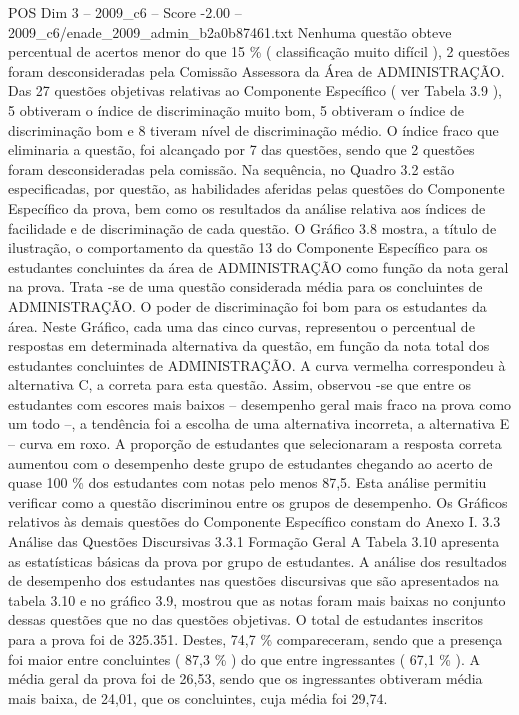 \begin{textsample}{POS Dim 3 – 2009\_c6 – Score -2.00 – 2009\_c6/enade\_2009\_admin\_b2a0b87461.txt}
Nenhuma questão obteve percentual de acertos menor do que 15 \% ( classificação muito difícil ), 2 questões foram desconsideradas pela Comissão Assessora da Área de ADMINISTRAÇÃO.
Das 27 questões objetivas relativas ao Componente Específico ( ver Tabela 3.9 ), 5 obtiveram o índice de discriminação muito bom, 5 obtiveram o índice de discriminação bom e 8 tiveram nível de discriminação médio.
O índice fraco que eliminaria a questão, foi alcançado por 7 das questões, sendo que 2 questões foram desconsideradas pela comissão.
Na sequência, no Quadro 3.2 estão especificadas, por questão, as habilidades aferidas pelas questões do Componente Específico da prova, bem como os resultados da análise relativa aos índices de facilidade e de discriminação de cada questão.
O Gráfico 3.8 mostra, a título de ilustração, o comportamento da questão 13 do Componente Específico para os estudantes concluintes da área de ADMINISTRAÇÃO como função da nota geral na prova.
Trata -se de uma questão considerada média para os concluintes de ADMINISTRAÇÃO.
O poder de discriminação foi bom para os estudantes da área.
Neste Gráfico, cada uma das cinco curvas, representou o percentual de respostas em determinada alternativa da questão, em função da nota total dos estudantes concluintes de ADMINISTRAÇÃO.
A curva vermelha correspondeu à alternativa C, a correta para esta questão.
Assim, observou -se que entre os estudantes com escores mais baixos – desempenho geral mais fraco na prova como um todo –, a tendência foi a escolha de uma alternativa incorreta, a alternativa E – curva em roxo.
A proporção de estudantes que selecionaram a resposta correta aumentou com o desempenho deste grupo de estudantes chegando ao acerto de quase 100 \% dos estudantes com notas pelo menos 87,5.
Esta análise permitiu verificar como a questão discriminou entre os grupos de desempenho.
Os Gráficos relativos às demais questões do Componente Específico constam do Anexo I. 3.3 Análise das Questões Discursivas 3.3.1 Formação Geral A Tabela 3.10 apresenta as estatísticas básicas da prova por grupo de estudantes.
A análise dos resultados de desempenho dos estudantes nas questões discursivas que são apresentados na tabela 3.10 e no gráfico 3.9, mostrou que as notas foram mais baixas no conjunto dessas questões que no das questões objetivas.
O total de estudantes inscritos para a prova foi de 325.351.
Destes, 74,7 \% compareceram, sendo que a presença foi maior entre concluintes ( 87,3 \% ) do que entre ingressantes ( 67,1 \% ).
A média geral da prova foi de 26,53, sendo que os ingressantes obtiveram média mais baixa, de 24,01, que os concluintes, cuja média foi 29,74.

\end{textsample}
